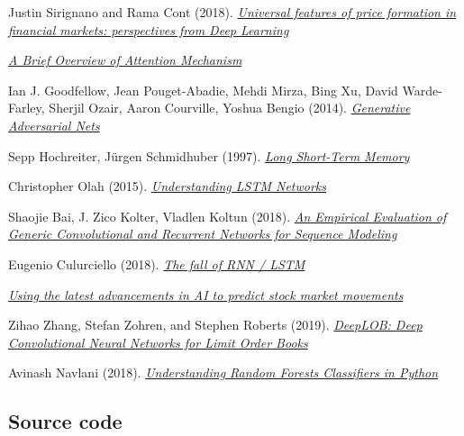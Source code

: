 \documentclass[11pt,a4paper,oneside]{article}
\begin{document}
\begin{references}{9}

   Justin Sirignano and Rama Cont (2018). 
  \emph{\href{https://arxiv.org/abs/1803.06917.pdf}{Universal features of price formation in financial markets: perspectives from Deep Learning}}

  \emph{\href{https://medium.com/syncedreview/a-brief-overview-of-attention-mechanism-13c578ba9129}{A Brief Overview of Attention Mechanism}}

   Ian J. Goodfellow, Jean Pouget-Abadie, Mehdi Mirza, Bing Xu, David Warde-Farley, Sherjil Ozair, Aaron Courville, Yoshua Bengio (2014). 
  \emph{\href{http://papers.nips.cc/paper/5423-generative-adversarial-nets.pdf}{Generative Adversarial Nets}}

   Sepp Hochreiter, Jürgen Schmidhuber (1997). 
  \emph{\href{https://www.bioinf.jku.at/publications/older/2604.pdf}{Long Short-Term Memory}}

   Christopher Olah (2015). 
  \emph{\href{https://colah.github.io/posts/2015-08-Understanding-LSTMs/}{Understanding LSTM Networks}}

   Shaojie Bai, J. Zico Kolter, Vladlen Koltun (2018). 
  \emph{\href{https://arxiv.org/pdf/1803.01271.pdf}{An Empirical Evaluation of Generic Convolutional and Recurrent Networks for Sequence Modeling}}
  
   Eugenio Culurciello (2018). 
  \emph{\href{https://towardsdatascience.com/the-fall-of-rnn-lstm-2d1594c74ce0}{The fall of RNN / LSTM}}

  \emph{\href{https://github.com/borisbanushev/stockpredictionai}{Using the latest advancements in AI to predict stock market movements}}

   Zihao Zhang, Stefan Zohren, and Stephen Roberts (2019). 
  \emph{\href{https://arxiv.org/abs/1803.06917.pdf}{DeepLOB: Deep Convolutional Neural Networks for Limit Order Books}}

   Avinash Navlani (2018). 
  \emph{\href{https://www.datacamp.com/community/tutorials/random-forests-classifier-python}{Understanding Random Forests Classifiers in Python}}

\end{references}

\subsection{Source code}
\label{sec:source_code}
\end{document}
